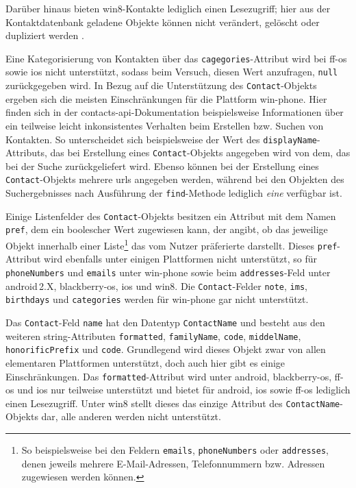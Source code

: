 Darüber hinaus bieten \gls{win8}-Kontakte lediglich einen Lesezugriff; hier aus der Kontaktdatenbank geladene Objekte können nicht verändert, gelöscht oder dupliziert werden \cite{Cordova_Plugin_Registry_Contacts}.

Eine Kategorisierung von Kontakten über das \lstinline|cagegories|-Attribut wird bei \gls{ff-os} sowie \gls{ios} nicht unterstützt, sodass beim Versuch, diesen Wert anzufragen, \lstinline|null| zurückgegeben wird.
In Bezug auf die Unterstützung des \lstinline|Contact|-Objekts ergeben sich die meisten Einschränkungen für die Plattform \gls{win-phone}.
Hier finden sich in der \gls{contacts-api}-Dokumentation beispielsweise Informationen über ein teilweise leicht inkonsistentes Verhalten beim Erstellen bzw. Suchen von Kontakten.
So unterscheidet sich beispielsweise der Wert des \lstinline|displayName|-Attributs, das bei Erstellung eines \lstinline|Contact|-Objekts angegeben wird von dem, das bei der Suche zurückgeliefert wird.
Ebenso können bei der Erstellung eines \lstinline|Contact|-Objekts mehrere \glspl{url} angegeben werden, während bei den Objekten des Suchergebnisses nach Ausführung der \lstinline|find|-Methode lediglich \emph{eine} verfügbar ist.

Einige Listenfelder des \lstinline|Contact|-Objekts besitzen ein Attribut mit dem Namen \lstinline|pref|, dem ein boolescher Wert zugewiesen kann, der angibt, ob das jeweilige Objekt innerhalb einer Liste\footnote{So beispielsweise bei den Feldern \lstinline|emails|, \lstinline|phoneNumbers| oder \lstinline|addresses|, denen jeweils mehrere E-Mail-Adressen, Telefonnummern bzw. Adressen zugewiesen werden können.} das vom Nutzer präferierte darstellt.
Dieses \lstinline|pref|-Attribut wird ebenfalls unter einigen Plattformen nicht unterstützt, so \zB für \lstinline|phoneNumbers| und \lstinline|emails| unter \gls{win-phone} sowie beim \lstinline|addresses|-Feld unter \gls{android}\,2.X, \gls{blackberry-os}, \gls{ios} und \gls{win8}.
Die \lstinline|Contact|-Felder \mbox{\lstinline|note|,} \mbox{\lstinline|ims|,} \lstinline|birthdays| und \lstinline|categories| werden für \gls{win-phone} gar nicht unterstützt.

Das \og \lstinline|Contact|-Feld \lstinline|name| hat den Datentyp \lstinline|ContactName| und besteht aus den weiteren \gls{string}-Attributen \mbox{\lstinline|formatted|,} \mbox{\lstinline|familyName|,} \mbox{\lstinline|code|,} \mbox{\lstinline|middelName|,} \lstinline|honorificPrefix| und \lstinline|code|.
Grundlegend wird dieses Objekt zwar von allen elementaren Plattformen unterstützt, doch auch hier gibt es einige Einschränkungen.
Das \lstinline|formatted|-Attribut wird unter \gls{android}, \gls{blackberry-os}, \gls{ff-os} und \gls{ios} nur teilweise unterstützt und bietet für \gls{android}, \gls{ios} sowie \gls{ff-os} lediglich einen Lesezugriff.
Unter \gls{win8} stellt dieses das einzige Attribut des \lstinline|ContactName|-Objekts dar, alle anderen werden nicht unterstützt.

